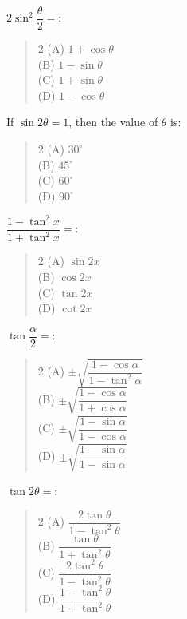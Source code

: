\documentclass[11pt,a4paper]{article}
\begin{document}
\begin{mcqlist}
\item $2\sin^2\dfrac{\theta}{2} = $:
\begin{quote}\begin{multicols}{2}
\noindent (A) $1+\cos\theta$ \\
(B) $1-\sin\theta$ \\
(C) $1+\sin\theta$ \\
(D) $1-\cos\theta$
\end{multicols}\end{quote}

\item If $\sin2\theta=1$, then the value of $\theta$ is:
\begin{quote}\begin{multicols}{2}
\noindent (A) $30^{\circ}$ \\
(B) $45^{\circ}$ \\
(C) $60^{\circ}$ \\
(D) $90^{\circ}$
\end{multicols}\end{quote}

\item $\dfrac{1-\tan^2x}{1+\tan^2x} = $:
\begin{quote}\begin{multicols}{2}
\noindent (A) $\sin2x$ \\
(B) $\cos2x$ \\
(C) $\tan2x$ \\
(D) $\cot2x$
\end{multicols}\end{quote}

\item $\tan\dfrac{\alpha}{2} = $:
\begin{quote}\begin{multicols}{2}
\noindent (A) $\pm\sqrt{\dfrac{1-\cos\alpha}{1-\tan^2\alpha}}$ \\
(B) $\pm\sqrt{\dfrac{1-\cos\alpha}{1+\cos\alpha}}$ \\
(C) $\pm\sqrt{\dfrac{1-\sin\alpha}{1-\cos\alpha}}$ \\
(D) $\pm\sqrt{\dfrac{1-\sin\alpha}{1-\sin\alpha}}$
\end{multicols}\end{quote}

\item $\tan2\theta = $:
\begin{quote}\begin{multicols}{2}
\noindent (A) $\dfrac{2\tan\theta}{1-\tan^2\theta}$ \\
(B) $\dfrac{\tan\theta}{1+\tan^2\theta}$ \\
(C) $\dfrac{2\tan^2\theta}{1-\tan^2\theta}$ \\
(D) $\dfrac{1-\tan^2\theta}{1+\tan^2\theta}$
\end{multicols}\end{quote}


\end{mcqlist}
\end{document}
